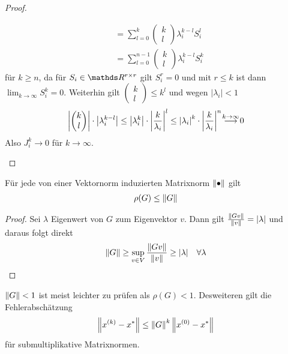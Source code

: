 \begin{Satze}[Konvergenzkriterien]
\begin{proof}
\begin{description}
\begin{align*}
        &= \sum_{l=0}^{k}\begin{pmatrix}k\\l\end{pmatrix}
  \lambda_i^{k-l} S_i^l\\
        &=\sum_{l=0}^{n-1} \begin{pmatrix}k\\l\end{pmatrix}
  \lambda_i^{k-l} S_i^{k}
\end{align*}
für $k\geq n$, da für $S_i\in\R^{r\times r}$ gilt $S_i^r=0$ 
und mit $r\leq k$ ist dann $\lim_{k\to\infty}S_i^k=0$.
Weiterhin gilt $\begin{pmatrix}k\\l\end{pmatrix}\leq k^l$ 
und wegen $|\lambda_i|<1$
\begin{gather*}
  \left| \begin{pmatrix}k\\l\end{pmatrix}\right|
  \cdot\left|\lambda_i^{k-l}\right|
  \leq \left|\lambda_i^{k}\right| 
  \cdot \left|\frac{k}{\lambda_i}\right|^l
  \leq \left|\lambda_i\right|^k
  \cdot \left|\frac{k}{\lambda_i}\right|^n
\overset{\mathclap{k\rightarrow \infty}}{\longrightarrow} 0
\end{gather*}
Also $J_i^k\longrightarrow 0$ für $k\longrightarrow \infty$.
  \end{description}
\end{proof}
\end{Satze}


\begin{Leme}
  Für jede von einer Vektornorm induzierten Matrixnorm 
$\left\| \bullet \right\|$ gilt
\begin{gather}
  \rho(G) \leq \left\| G \right\|
\label{IX.2.9}
\end{gather}
\begin{proof}
  Sei $\lambda$ Eigenwert von $G$ zum Eigenvektor $v$.
Dann gilt $\frac{\left\| Gv \right\|}{\left\| v \right\|} = |\lambda|$
und daraus folgt direkt
\begin{gather*}
  \left\| G \right\| \geq \sup_{v\in V}\frac{\left\| Gv \right\|}{\left\| v \right\|}\geq |\lambda|
  \quad \forall \lambda
\end{gather*}
\end{proof}
\end{Leme}

$\left\| G \right\|<1$ ist meist leichter zu prüfen als $\rho(G)<1$.
Desweiteren gilt die Fehlerabschätzung
\begin{gather}
   \left\| x^{(k)}-x^{*} \right\|\leq \left\| G \right\|^k\left\| x^{(0)}-x^{*} \right\|
   \label{IX.2.10}
\end{gather}
für submultiplikative Matrixnormen.

